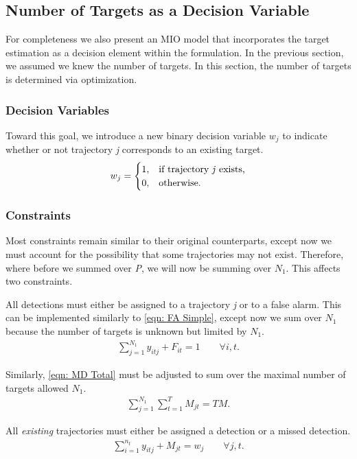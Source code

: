 \subsection{Number of Targets as a Decision Variable}
For completeness we also present an MIO model that incorporates the target estimation as a decision element within the formulation. In the previous section, we assumed we knew the number of targets. In this section, the number of targets is determined via optimization. 

\subsubsection{Decision Variables}
Toward this goal, we introduce a new binary decision variable $w_{j}$ to indicate whether or not trajectory \textit{j} corresponds to an existing target.
\[w_{j} = 
\begin{cases}
1, & \text{if trajectory \textit{j} exists,}\\
0, & \text{otherwise.}
\end{cases}\]

\subsubsection{Constraints}
Most constraints remain similar to their original counterparts, except now we must account for the possibility that some trajectories may not exist. Therefore, where before we summed over \textit{P}, we will now be summing over $N_{1}$. This affects two constraints.

All detections must either be assigned to a trajectory \textit{j} or to a false alarm. This can be implemented similarly to \eqref{eqn: FA Simple}, except now we sum over $N_{1}$ because the number of targets is unknown but limited by $N_{1}$.
\begin{align}
\sum_{j=1}^{N_{1}} y_{itj} + F_{it} = 1 \qquad \forall i,t.
\end{align}

Similarly, \eqref{eqn: MD Total} must be adjusted to sum over the maximal number of targets allowed $N_{1}$. 
\begin{align}
\sum_{j=1}^{N_{1}} \sum_{t=1}^{T} M_{jt} = TM.
\end{align}

All \textit{existing} trajectories must either be assigned a detection or a missed detection. 
\begin{align}\label{eqn: Existing Targets}
\sum_{i=1}^{n_{t}} y_{itj} + M_{jt} = w_{j} \qquad \forall j,t.
\end{align}

